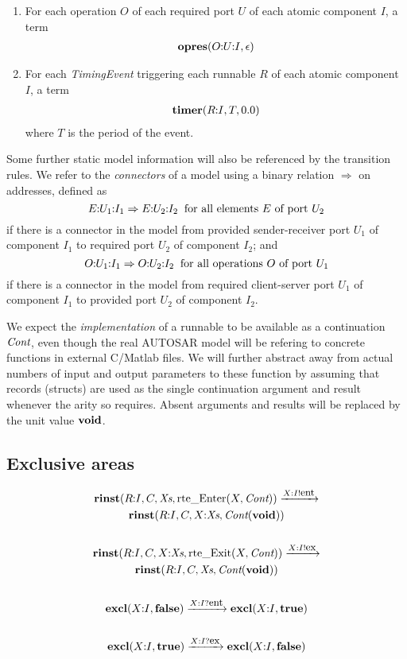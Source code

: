 \documentclass[twocolumn]{article}
\newcommand{\V}[1]{\mbox{\it #1}}
\newcommand{\Cont}{\V{Cont}}
\newcommand{\Xs}{\V{Xs}}
\newcommand{\void}{\mbox{\bf void}}
\newcommand{\true}{\mbox{\bf true}}
\newcommand{\false}{\mbox{\bf false}}
\newcommand{\seq}[2]{#1\hspace{-0.7ex}:\hspace{-0.7ex}#2}
\newcommand{\seqq}[3]{#1\hspace{-0.7ex}:\hspace{-0.7ex}#2\hspace{-0.7ex}:\hspace{-0.7ex}#3}
\newcommand{\rinst}[4]{\mbox{\bf rinst}(#1,#2,#3,#4)}
\newcommand{\excl}[2]{\mbox{\bf excl}(#1,#2)}
\newcommand{\opres}[2]{\mbox{\bf opres}(#1,#2)}
\newcommand{\timer}[3]{\mbox{\bf timer}(#1,#2, #3)}
\newcommand{\Enter}[2]{\mbox{rte\_Enter}(#1,#2)}
\newcommand{\Exit}[2]{\mbox{rte\_Exit}(#1,#2)}
\newcommand{\red}[1]{\xrightarrow{#1}}
\newcommand{\say}[2]{#1 ! #2}
\newcommand{\hear}[2]{#1 ? #2}
\newcommand{\ent}{\mbox{\small ent}}
\newcommand{\ex}{\mbox{\small ex}}
\begin{document}
\begin{enumerate}
\item For each operation $O$ of each required port $U$ of each atomic component $I$, a term
$$
\begin{array}{c}
	\opres{\seqq{O}{U}{I}}{\epsilon}
\end{array}
$$

\item For each {\em TimingEvent} triggering each runnable $R$ of each atomic component $I$, a term
$$
\begin{array}{c}
	\timer{\seq{R}{I}}{T}{0.0}
\end{array}
$$
where $T$ is the period of the event.

\end{enumerate}

Some further static model information will also be referenced by the transition rules. We refer to the {\em connectors} of a model using a binary relation $\Rightarrow$ on addresses, defined as
$$
	\seqq{E}{U_1}{I_1} \Rightarrow \seqq{E}{U_2}{I_2} \;\;\mbox{for all elements $E$ of port $U_2$}
$$
if there is a connector in the model from provided sender-receiver port $U_1$ of component $I_1$ to required port $U_2$ of component $I_2$; and
$$
	\seqq{O}{U_1}{I_1} \Rightarrow \seqq{O}{U_2}{I_2} \;\;\mbox{for all operations $O$ of port $U_1$}
$$
if there is a connector in the model from required client-server port $U_1$ of component $I_1$ to provided port $U_2$ of component $I_2$.

We expect the {\em implementation} of a runnable to be available as a continuation $\Cont$, even though the real AUTOSAR model will be refering to concrete functions in external C/Matlab files. We will further abstract away from actual numbers of input and output parameters to these function by assuming that records (structs) are used as the single continuation argument and result whenever the arity so requires. Absent arguments and results will be replaced by the unit value $\void$. 

\subsection{Exclusive areas}

\begin{gather*}
	\rinst{\seq{R}{I}}{C}{\Xs}{\Enter{X}{\Cont}}  \red{\say{X:I}{\ent}}  \\
		\rinst{\seq{R}{I}}{C}{\seq X \Xs}{\Cont(\void)} \\
	\\
	\rinst{\seq{R}{I}}{C}{\seq X \Xs}{\Exit{X}{\Cont}}  \red{\say{X:I}{\ex}}  \\
		\rinst{\seq{R}{I}}{C}{\Xs}{\Cont(\void)} \\
	\\
	\excl{\seq X I}{\false} \red{\hear{X:I}{\ent}} \excl{\seq X I}{\true} \\
	\\
	\excl{\seq X I}{\true} \red{\hear{X:I}{\ex}} \excl{\seq X I}{\false} \\
	\\
\end{gather*}
\end{document}
